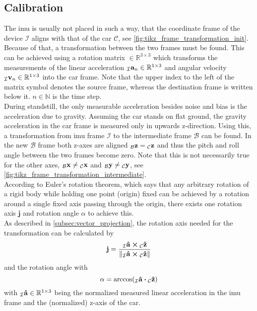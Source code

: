 \subsection{Calibration}
\label{ssec:calibration_imu}
The \gls{imu} is usually not placed in such a way, that the coordinate frame of the device $\mathcal{I}$ aligns with that of the car $\mathcal{C}$, see \cref{fig:tikz_frame_transformation_init}.
Because of that, a transformation between the two frames must be found.
This can be achieved using a rotation matrix  $\in \mathbb{R}^{3\times3}$ which transforms the measurements of the linear acceleration $\vincs{a}{I}_n \in \mathbb{R}^{1\times3}$ and angular velocity ${\vincs{v}{I}_n \in \mathbb{R}^{1\times3}}$ into the car frame.
Note that the upper index to the left of the matrix symbol denotes the source frame, whereas the destination frame is written below it.
$n \in \mathbb{N}$ is the time step.\\
During standstill, the only measurable acceleration besides noise and bias is the acceleration due to gravity.
Assuming the car stands on flat ground, the gravity acceleration in the car frame is measured only in upwards z-direction.
Using this, a transformation from \gls{imu} frame $\mathcal{I}$ to the intermediate frame $\mathcal{B}$ can be found.
In the new $\mathcal{B}$ frame both z-axes are aligned $\vincs{z}{b} = \vincs{z}{c}$ and thus the pitch and roll angle between the two frames become zero.
Note that this is not necessarily true for the other axes, $\vincs{x}{b}\neq\vincs{x}{c}$ and $\vincs{y}{b}\neq\vincs{y}{c}$, see \cref{fig:tikz_frame_transformation_intermediate}.\\
According to Euler's rotation theorem, which says that any arbitrary rotation of a rigid body while holding one point (origin) fixed can be achieved by a rotation around a single fixed axis passing through the origin, there exists one rotation axis $\mathbf{j}$ and rotation angle $\alpha$ to achieve this.\\
As described in \cref{subsec:vector_projection}, the rotation axis needed for the transformation can be calculated by
\begin{equation}
	\vb{j} = \frac{\vincs{\vu{a}}{i} \cp \vincs{\vu{z}}{c}}{\norm{\vincs{\vu{a}}{i} \cp \vincs{\vu{z}}{c}}}
\end{equation}
and the rotation angle with
\begin{equation}
	\alpha = \arccos(\vincs{\vu{a}}{i}\vdot \vincs{\vu{z}}{c})
\end{equation}
with $\vincs{\vu{a}}{i} \in \mathbb{R}^{1\times3}$ being the normalized measured linear acceleration in the \gls{imu} frame and  the (normalized) z-axis of the car.\\
